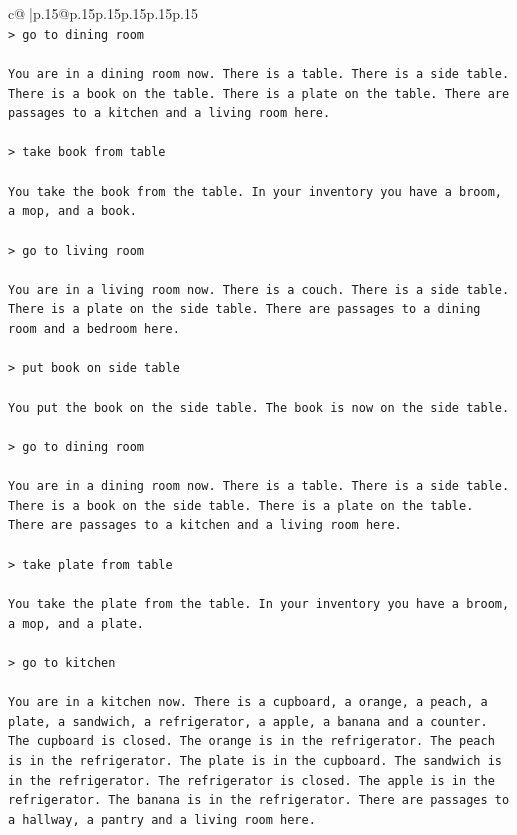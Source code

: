 \documentclass{article}
\begin{document}
{\begin{supertabular}{c@{$\;$}|p{.15\linewidth}@{}p{.15\linewidth}p{.15\linewidth}p{.15\linewidth}p{.15\linewidth}p{.15\linewidth}}
{{{\\ 
\texttt{> go to dining room} \\
\\ 
\texttt{You are in a dining room now. There is a table. There is a side table. There is a book on the table. There is a plate on the table. There are passages to a kitchen and a living room here.} \\
\\ 
\texttt{> take book from table} \\
\\ 
\texttt{You take the book from the table. In your inventory you have a broom, a mop, and a book.} \\
\\ 
\texttt{> go to living room} \\
\\ 
\texttt{You are in a living room now. There is a couch. There is a side table. There is a plate on the side table. There are passages to a dining room and a bedroom here.} \\
\\ 
\texttt{> put book on side table} \\
\\ 
\texttt{You put the book on the side table. The book is now on the side table.} \\
\\ 
\texttt{> go to dining room} \\
\\ 
\texttt{You are in a dining room now. There is a table. There is a side table. There is a book on the side table. There is a plate on the table. There are passages to a kitchen and a living room here.} \\
\\ 
\texttt{> take plate from table} \\
\\ 
\texttt{You take the plate from the table. In your inventory you have a broom, a mop, and a plate.} \\
\\ 
\texttt{> go to kitchen} \\
\\ 
\texttt{You are in a kitchen now. There is a cupboard, a orange, a peach, a plate, a sandwich, a refrigerator, a apple, a banana and a counter. The cupboard is closed. The orange is in the refrigerator. The peach is in the refrigerator. The plate is in the cupboard. The sandwich is in the refrigerator. The refrigerator is closed. The apple is in the refrigerator. The banana is in the refrigerator. There are passages to a hallway, a pantry and a living room here.} \\
}}}
\end{supertabular}}
\end{document}
